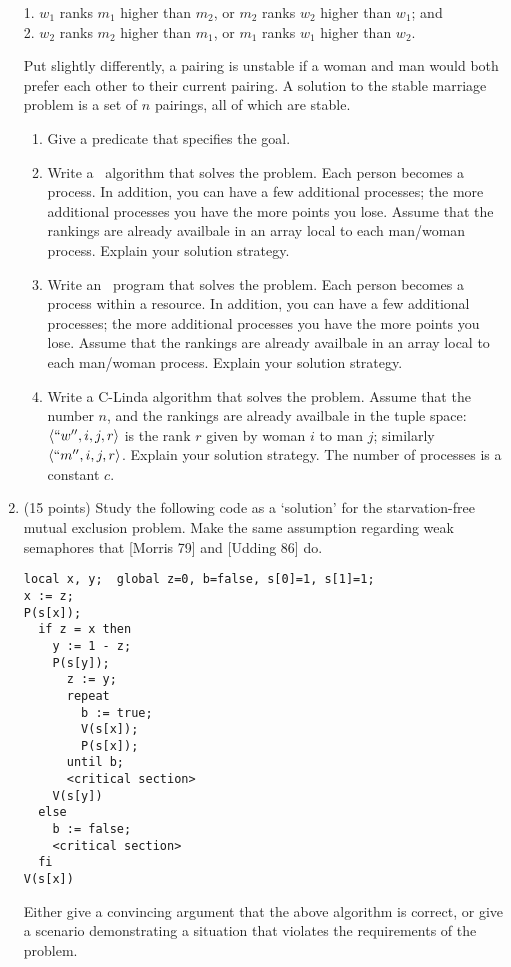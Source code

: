 \begin{enumerate}
1. $w_1$ ranks $m_1$ higher than $m_2$, or $m_2$ ranks $w_2$ higher than $w_1$; and\\
2. $w_2$ ranks $m_2$ higher than $m_1$, or $m_1$ ranks $w_1$ higher than $w_2$.

Put slightly differently, a pairing is unstable if a woman and man
would both prefer each other to their current pairing.  A solution to
the stable marriage problem is a set of $n$ pairings, all of which are
stable.

\begin{enumerate}
\item Give a predicate that specifies the goal.

\item Write a \CSP\ algorithm that solves the problem.  Each person
becomes a process.  In addition, you can have a few additional
processes; the more additional processes you have the more points you
lose.  Assume that the rankings are already availbale in an array
local to each man/woman process.  Explain your solution strategy.

\item Write an \SR\ program that solves the problem.  Each person
becomes a process within a resource.  In addition, you can have a few
additional processes; the more additional processes you have the more
points you lose.  Assume that the rankings are already availbale in an
array local to each man/woman process.  Explain your solution
strategy.

\item Write a C-Linda algorithm that solves the problem.  Assume that
the number $n$, and the rankings are already availbale in the tuple
space: $\langle ``w'', i, j, r \rangle$ is the rank $r$ given by woman $i$ to
man $j$; similarly $\langle ``m'', i, j, r \rangle$.  Explain your solution
strategy.  The number of processes is a constant $c$.

\end{enumerate}


\item (15 points)
Study the following code as a `solution' for the starvation-free
mutual exclusion problem.  Make the same assumption regarding weak
semaphores that [Morris 79] and [Udding 86] do.

\begin{verbatim}
local x, y;  global z=0, b=false, s[0]=1, s[1]=1;
x := z;
P(s[x]);
  if z = x then
    y := 1 - z;
    P(s[y]);
      z := y;
      repeat
        b := true;
        V(s[x]);
        P(s[x]);
      until b;
      <critical section>
    V(s[y])
  else
    b := false;
    <critical section>
  fi
V(s[x])
\end{verbatim}
Either give a convincing argument that the above algorithm is correct,
or give a scenario demonstrating a situation that violates the
requirements of the problem.

\end{enumerate}


